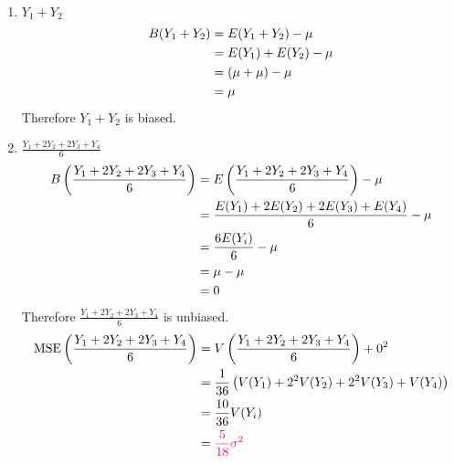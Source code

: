 \documentclass[12pt]{article}
\newcommand{\pars}[1]{\left( {#1} \right) }
\begin{document}
\begin{enumerate}
\begin{enumerate}[label=\textbf{\Alph*}.)]
        
        \item $Y_1 + Y_2$
        \begin{align}
            B(Y_1 + Y_2)
            &= E(Y_1 + Y_2) - \mu \notag\\
            &= E(Y_1) + E(Y_2) - \mu \notag\\
            &= (\mu + \mu) - \mu \notag\\
            &= \mu \notag
        \end{align}
        Therefore $Y_1 + Y_2$ is biased.
        \newpage
        
        
        \item $\frac{Y_1 + 2Y_2 + 2Y_3 + Y_4}{6}$
        \begin{align}
            B\pars{\frac{Y_1 + 2Y_2 + 2Y_3 + Y_4}{6}}
            &= E\pars{\frac{Y_1 + 2Y_2 + 2Y_3 + Y_4}{6}} - \mu \notag\\
            &= \frac{E(Y_1) + 2E(Y_2) + 2E(Y_3) + E(Y_4)}{6} - \mu \notag\\
            &= \frac{6 E(Y_i)}{6} - \mu \notag\\
            &= \mu - \mu \notag\\
            &= 0 \notag
        \end{align}
        Therefore $\frac{Y_1 + 2Y_2 + 2Y_3 + Y_4}{6}$ is unbiased.
        \begin{align}
            \operatorname{MSE}\pars{\frac{Y_1 + 2Y_2 + 2Y_3 + Y_4}{6}} &= V\pars{\frac{Y_1 + 2Y_2 + 2Y_3 + Y_4}{6}} + 0^2 \notag\\ &= \frac{1}{36} \pars{V(Y_1) + 2^2V(Y_2) + 2^2V(Y_3) + V(Y_4)} \notag\\ &= \frac{10}{36}V(Y_i) \notag\\ &= \color{magenta} \frac{5}{18} \sigma^2\notag
        \end{align}
        \vspace{0.1in}
        

\end{enumerate}
\end{enumerate}
\end{document}
